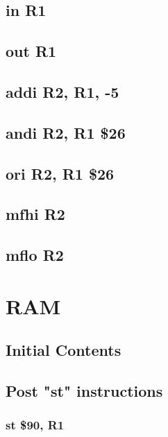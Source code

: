 \documentclass{article}
\begin{document}
    \subsection{in R1} \label{in_sequence}
        
    \subsection{out R1} \label{out_sequence}
        
    \subsection{addi R2, R1, -5} \label{addi_sequence}
        
    \subsection{andi R2, R1 \$26} \label{andi_sequence}
        
    \subsection{ori R2, R1 \$26} \label{ori_sequence}
        
    \subsection{mfhi R2} \label{mfhi_sequence}
        
    \subsection{mflo R2} \label{mflo_sequence}
        

\section{RAM}
    \subsection{Initial Contents} \label{ram_init}
        
    \subsection{Post "st" instructions}
        \subsubsection{st \$90, R1} \label{ram_st_case_1}
            
\end{document}
